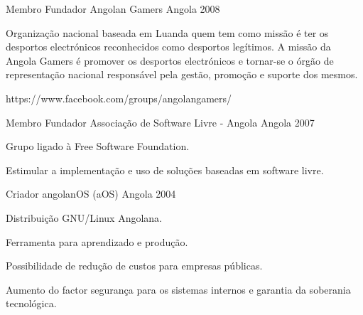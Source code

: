 


\begin{cventries}


\cventry
{Membro Fundador} %
{Angolan Gamers} %
{Angola} %
{2008} %
{ %
\begin{cvitems}
\item {Organização nacional baseada em Luanda quem tem como missão é ter os desportos electrónicos reconhecidos como desportos legítimos. A missão da Angola Gamers é promover os desportos electrónicos e tornar-se o órgão de representação nacional responsável pela gestão, promoção e suporte dos mesmos.}
\item {https://www.facebook.com/groups/angolangamers/}
\end{cvitems}
}


\cventry
{Membro Fundador} %
{Associação de Software Livre - Angola} %
{Angola} %
{2007} %
{ %
\begin{cvitems}
\item {Grupo ligado à Free Software Foundation.}
\item {Estimular a implementação e uso de soluções baseadas em software livre.}
\end{cvitems}
}


\cventry
{Criador} %
{angolanOS (aOS)} %
{Angola} %
{2004} %
{ %
\begin{cvitems}
\item {Distribuição GNU/Linux Angolana.}
\item {Ferramenta para aprendizado e produção.}
\item {Possibilidade de redução de custos para empresas públicas.}
\item {Aumento do factor segurança para os sistemas internos e garantia da soberania tecnológica.}
\end{cvitems}
}


\end{cventries}
